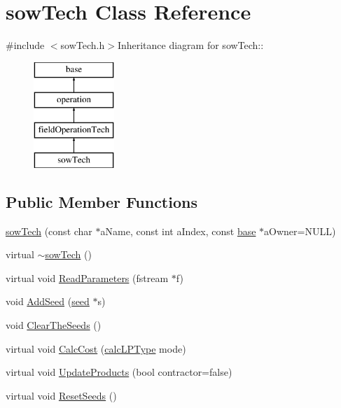 \hypertarget{classsow_tech}{
\section{sowTech Class Reference}
\label{classsow_tech}
}


{\ttfamily \#include $<$sowTech.h$>$}Inheritance diagram for sowTech::\begin{figure}[H]
\begin{center}
\leavevmode
\includegraphics[height=4cm]{classsow_tech}
\end{center}
\end{figure}
\subsection*{Public Member Functions}
\begin{DoxyCompactItemize}
\item 
\hyperlink{classsow_tech_af2c05557103b1f521bf0eb9fa3c99184}{sowTech} (const char $\ast$aName, const int aIndex, const \hyperlink{classbase}{base} $\ast$aOwner=NULL)
\item 
virtual \hyperlink{classsow_tech_a166961c766601040ddbc7c0c7512898c}{$\sim$sowTech} ()
\item 
virtual void \hyperlink{classsow_tech_aa606f377adfc0cf3fd80d96ba2576fcc}{ReadParameters} (fstream $\ast$f)
\item 
void \hyperlink{classsow_tech_a325472a41315e1397c1ca4926a5caf4f}{AddSeed} (\hyperlink{classseed}{seed} $\ast$s)
\item 
void \hyperlink{classsow_tech_ab449c30df32928c4d35b52dd60fbfb75}{ClearTheSeeds} ()
\item 
virtual void \hyperlink{classsow_tech_a044008a71f40c31f0bd3469476c70e97}{CalcCost} (\hyperlink{typer_8h_af05cf854fc14086a0d6404be5ae9813f}{calcLPType} mode)
\item 
virtual void \hyperlink{classsow_tech_a0cfbd371272aa15a18bca486a2926464}{UpdateProducts} (bool contractor=false)
\item 
virtual void \hyperlink{classsow_tech_a1f109785f7a75ea155724d5eaa4d29fb}{ResetSeeds} ()
\end{DoxyCompactItemize}

